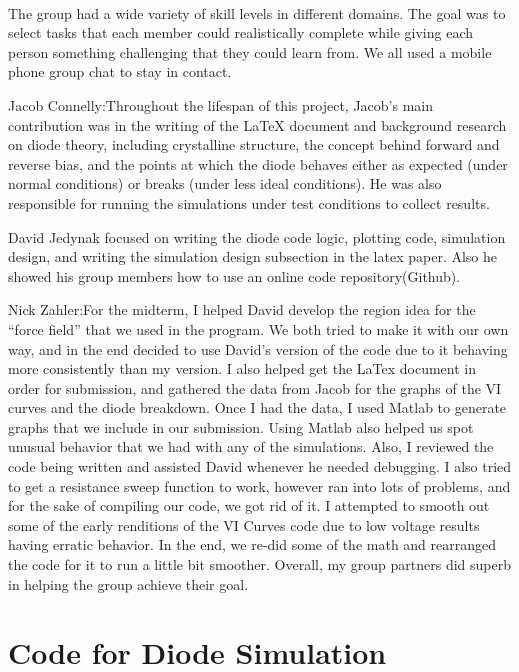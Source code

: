 \documentclass[a4paper]{article}
\begin{document}
\paragraph{}
 The group had a wide variety of skill levels in different domains. The goal was to select tasks that each member could realistically complete while giving each person something challenging that they could learn from. We all used a mobile phone group chat to stay in contact.
 
Jacob Connelly:Throughout the lifespan of this project, Jacob's main contribution was in the writing of the LaTeX document and background research on diode theory, including crystalline structure, the concept behind forward and reverse bias, and the points at which the diode behaves either as expected (under normal conditions) or breaks (under less ideal conditions). He was also responsible for running the simulations under test conditions to collect results.

David Jedynak focused on writing the diode code logic, plotting code, simulation design, and writing the simulation design subsection in the latex paper. Also he showed his group members how to use an online code repository(Github).

Nick Zahler:For the midterm, I helped David develop the region idea for the “force field” that we used in the program. We both tried to make it with our own way, and in the end decided to use David’s version of the code due to it behaving more consistently than my version. I also helped get the LaTex document in order for submission, and gathered the data from Jacob for the graphs of the VI curves and the diode breakdown. Once I had the data, I used Matlab to generate graphs that we include in our submission.  Using Matlab also helped us spot unusual behavior that we had with any of the simulations. Also, I reviewed the code being written and assisted David whenever he needed debugging. I also tried to get a resistance sweep function to work, however ran into lots of problems, and for the sake of compiling our code, we got rid of it. I attempted to smooth out some of the early renditions of the VI Curves code due to low voltage results having erratic behavior. In the end, we re-did some of the math and rearranged the code for it to run a little bit smoother. Overall, my group partners did superb in helping the group achieve their goal. 


\section{Code for Diode Simulation}
\end{document}
